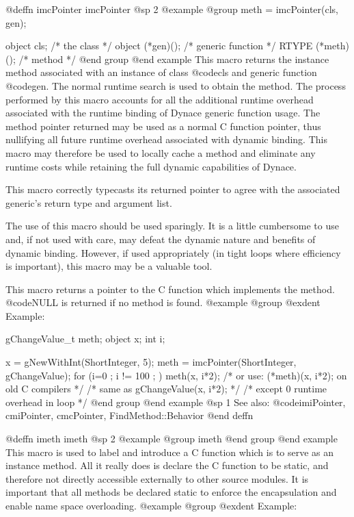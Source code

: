 {{{{@deffn {imcPointer} imcPointer
@sp 2
@example
@group
meth = imcPointer(cls, gen);

object  cls;            /*  the class           */
object  (*gen)();       /*  generic function    */
RTYPE   (*meth)();      /*  method              */
@end group
@end example
This macro returns the instance method associated with an instance of
class @code{cls} and generic function @code{gen}.  The normal runtime
search is used to obtain the method.  The process performed by this
macro accounts for all the additional runtime overhead associated with
the runtime binding of Dynace generic function usage.  The method pointer
returned may be used as a normal C function pointer, thus nullifying all
future runtime overhead associated with dynamic binding.  This macro may
therefore be used to locally cache a method and eliminate any runtime
costs while retaining the full dynamic capabilities of Dynace. 

This macro correctly typecasts its returned pointer to agree with
the associated generic's return type and argument list.

The use of this macro should be used sparingly.  It is a little
cumbersome to use and, if not used with care, may defeat the dynamic
nature and benefits of dynamic binding.  However, if used appropriately
(in tight loops where efficiency is important), this macro may be
a valuable tool.

This macro returns a pointer to the C function which implements the method.
@code{NULL} is returned if no method is found.
@example
@group
@exdent Example:

gChangeValue_t  meth;
object  x;
int     i;

x = gNewWithInt(ShortInteger, 5);
meth = imcPointer(ShortInteger, gChangeValue);
for (i=0 ; i != 100 ; )
        meth(x, i*2);
/* or use:  (*meth)(x, i*2);  on old C compilers */
/* same as gChangeValue(x, i*2);  */
/* except 0 runtime overhead in loop          */
@end group
@end example
@sp 1
See also:  @code{imiPointer, cmiPointer, cmcPointer, FindMethod::Behavior}
@end deffn

















@deffn {imeth} imeth
@sp 2
@example
@group
imeth
@end group
@end example
This macro is used to label and introduce a C function which is to serve
as an instance method.  All it really does is declare the C function to be
static, and therefore not directly accessible externally to other source
modules.  It is important that all methods be declared static to enforce
the encapsulation and enable name space overloading.
@example
@group
@exdent Example:

}}}}
